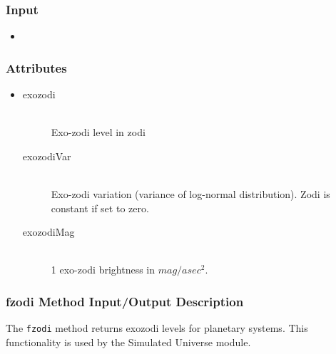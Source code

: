 \documentclass[cleanfoot]{asme2ej}
\begin{document}
\subsubsection*{Input}
\begin{itemize}
\item
{}
\end{itemize}

\subsubsection*{Attributes}
\begin{itemize}
\item
\begin{description}
        \item[exozodi] \hfill \\
        Exo-zodi level in zodi
        \item[exozodiVar] \hfill \\
        Exo-zodi variation (variance of log-normal distribution). Zodi is constant if set to zero.
        \item[exozodiMag] \hfill \\
        1 exo-zodi brightness in $ mag/asec^2 $.
\end{description}
\end{itemize}

\subsubsection{fzodi Method Input/Output Description} \label{sec:fzoditask}
The \verb+fzodi+ method returns exozodi levels for planetary systems.  This functionality is used by the Simulated Universe module.
\end{document}
